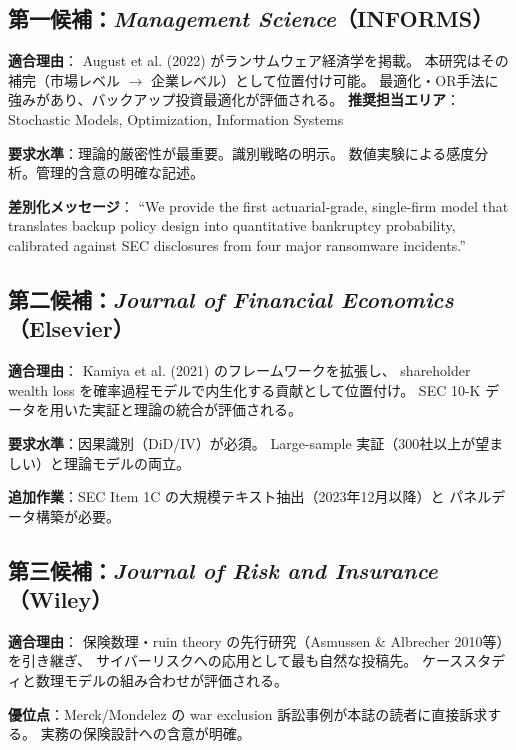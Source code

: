 \documentclass[a4paper,11pt]{article}
\theoremstyle{definition}
\begin{document}
\subsection{第一候補：\textit{Management Science}（INFORMS）}

\begin{tcolorbox}[notebox]
  \textbf{適合理由}：
  August et al. (2022) がランサムウェア経済学を掲載。
  本研究はその補完（市場レベル $\to$ 企業レベル）として位置付け可能。
  最適化・OR手法に強みがあり、バックアップ投資最適化が評価される。
  \textbf{推奨担当エリア}：Stochastic Models, Optimization, Information Systems

  \textbf{要求水準}：理論的厳密性が最重要。識別戦略の明示。
  数値実験による感度分析。管理的含意の明確な記述。

  \textbf{差別化メッセージ}：
  ``We provide the first actuarial-grade, single-firm model that translates
  backup policy design into quantitative bankruptcy probability,
  calibrated against SEC disclosures from four major ransomware incidents.''
\end{tcolorbox}

\subsection{第二候補：\textit{Journal of Financial Economics}（Elsevier）}

\begin{tcolorbox}[notebox]
  \textbf{適合理由}：
  Kamiya et al. (2021) のフレームワークを拡張し、
  shareholder wealth loss を確率過程モデルで内生化する貢献として位置付け。
  SEC 10-K データを用いた実証と理論の統合が評価される。

  \textbf{要求水準}：因果識別（DiD/IV）が必須。
  Large-sample 実証（300社以上が望ましい）と理論モデルの両立。

  \textbf{追加作業}：SEC Item 1C の大規模テキスト抽出（2023年12月以降）と
  パネルデータ構築が必要。
\end{tcolorbox}

\subsection{第三候補：\textit{Journal of Risk and Insurance}（Wiley）}

\begin{tcolorbox}[notebox]
  \textbf{適合理由}：
  保険数理・ruin theory の先行研究（Asmussen \& Albrecher 2010等）を引き継ぎ、
  サイバーリスクへの応用として最も自然な投稿先。
  ケーススタディと数理モデルの組み合わせが評価される。

  \textbf{優位点}：Merck/Mondelez の war exclusion 訴訟事例が本誌の読者に直接訴求する。
  実務の保険設計への含意が明確。
\end{tcolorbox}
\end{document}
